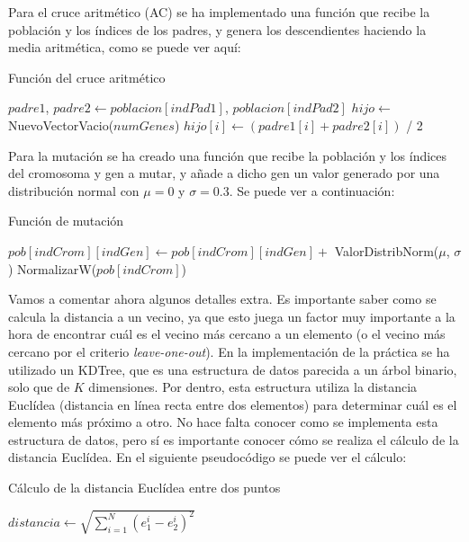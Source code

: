 \documentclass[11pt,a4paper]{article}
\begin{document}
Para el cruce aritmético (AC) se ha implementado una función que recibe la población y los índices de los padres, y genera
los descendientes haciendo la media aritmética, como se puede ver aquí:

\begin{algorithm}[H]
\caption{Función del cruce aritmético}
\begin{algorithmic}[1]
\State $padre1$, $padre2 \gets poblacion[indPad1]$, $poblacion[indPad2]$
\State $hijo \gets$ NuevoVectorVacio($numGenes$)
	\State $hijo[i] \gets (padre1[i] + padre2[i])$ / 2
\EndFor
\State {}
\EndFunction
\end{algorithmic}
\end{algorithm}

Para la mutación se ha creado una función que recibe la población y los índices del cromosoma y gen a mutar, y añade a dicho
gen un valor generado por una distribución normal con $\mu = 0$ y $\sigma = 0.3$. Se puede ver a continuación:

\begin{algorithm}[H]
\caption{Función de mutación}
\begin{algorithmic}[1]
\State $pob[indCrom][indGen] \gets pob[indCrom][indGen] + $ ValorDistribNorm($\mu$, $\sigma$)
\State NormalizarW($pob[indCrom]$)
\EndProcedure
\end{algorithmic}
\end{algorithm}

Vamos a comentar ahora algunos detalles extra. Es importante saber como se calcula la distancia a un vecino, ya que esto juega
un factor muy importante a la hora de encontrar cuál es el vecino más cercano a un elemento (o el vecino más cercano por el
criterio \textit{leave-one-out}). En la implementación de la práctica se ha utilizado un KDTree, que es una estructura de datos
parecida a un árbol binario, solo que de $K$ dimensiones. Por dentro, esta estructura utiliza la distancia Euclídea (distancia
en línea recta entre dos elementos) para determinar cuál es el elemento más próximo a otro. No hace falta conocer como se
implementa esta estructura de datos, pero sí es importante conocer cómo se realiza el cálculo de la distancia Euclídea. En el
siguiente pseudocódigo se puede ver el cálculo:

\begin{algorithm}[H]
\caption{Cálculo de la distancia Euclídea entre dos puntos}
\begin{algorithmic}
\State $distancia \gets \sqrt{\sum_{i=1}^{N} (e_1^i - e_2^i)^2}$
\State {}
\EndFunction
\end{algorithmic}
\end{algorithm}
\end{document}

